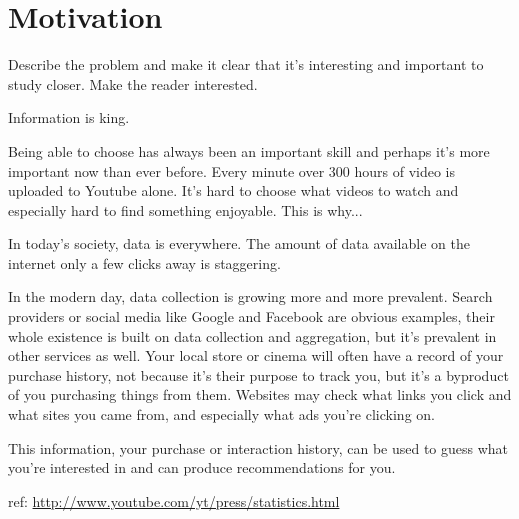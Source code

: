 
\section{Motivation}\label{sec:intro:motivation}

Describe the problem and make it clear that it's interesting and important to study closer. Make the reader interested.

Information is king.

Being able to choose has always been an important skill and perhaps it's more important now than ever before. Every minute over 300 hours of video is uploaded to Youtube alone. It's hard to choose what videos to watch and especially hard to find something enjoyable. This is why...

In today's society, data is everywhere. The amount of data available on the internet only a few clicks away is staggering. 

In the modern day, data collection is growing more and more prevalent. Search providers or social media like Google and Facebook are obvious examples, their whole existence is built on data collection and aggregation, but it's prevalent in other services as well. Your local store or cinema will often have a record of your purchase history, not because it's their purpose to track you, but it's a byproduct of you purchasing things from them. Websites may check what links you click and what sites you came from, and especially what ads you're clicking on.

This information, your purchase or interaction history, can be used to guess what you're interested in and can produce recommendations for you.

ref: \url{http://www.youtube.com/yt/press/statistics.html}


